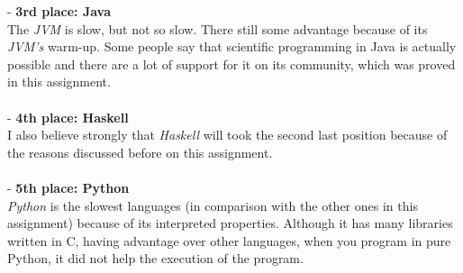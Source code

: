 \documentclass[conference]{IEEEtran}
\begin{document}
- \textbf{3rd place: Java}\\
The \textit{JVM} is slow, but not so slow. There still some advantage because of its \textit{JVM's} warm-up. Some people say that scientific programming in Java is actually possible and there are a lot of support for it on its community, which was proved in this assignment.
\\\\
- \textbf{4th place: Haskell}\\
I also believe strongly that \textit{Haskell} will took the second last position because of the reasons discussed before on this assignment.
\\\\
- \textbf{5th place: Python}\\
\textit{Python} is the slowest languages (in comparison with the other ones in this assignment) because of its interpreted properties. Although it has many libraries written in C, having advantage over other languages, when you program in pure Python, it did not help the execution of the program.
\end{document}
